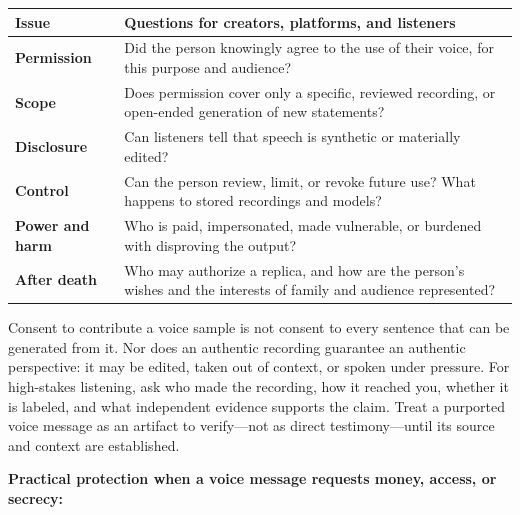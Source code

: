 \documentclass[
  11pt,
  letterpaper,
]{article}
\newcounter{none} %
\begin{document}
{\def\LTcaptype{none} %
\begin{longtable}[]{@{}
  >{\raggedright\arraybackslash}p{}
  >{\raggedright\arraybackslash}p{}@{}}
\toprule\noalign{}
\begin{minipage}[b]{\linewidth}\raggedright
Issue
\end{minipage} & \begin{minipage}[b]{\linewidth}\raggedright
Questions for creators, platforms, and listeners
\end{minipage} \\
\midrule\noalign{}
\endhead
\bottomrule\noalign{}
\endlastfoot
\textbf{Permission} & Did the person knowingly agree to the use of their
voice, for this purpose and audience? \\
\textbf{Scope} & Does permission cover only a specific, reviewed
recording, or open-ended generation of new statements? \\
\textbf{Disclosure} & Can listeners tell that speech is synthetic or
materially edited? \\
\textbf{Control} & Can the person review, limit, or revoke future use?
What happens to stored recordings and models? \\
\textbf{Power and harm} & Who is paid, impersonated, made vulnerable, or
burdened with disproving the output? \\
\textbf{After death} & Who may authorize a replica, and how are the
person's wishes and the interests of family and audience represented? \\
\end{longtable}
}

Consent to contribute a voice sample is not consent to every sentence
that can be generated from it. Nor does an authentic recording guarantee
an authentic perspective: it may be edited, taken out of context, or
spoken under pressure. For high-stakes listening, ask who made the
recording, how it reached you, whether it is labeled, and what
independent evidence supports the claim. Treat a purported voice message
as an artifact to verify---not as direct testimony---until its source
and context are established.

\textbf{Practical protection when a voice message requests money,
access, or secrecy:}
\end{document}

